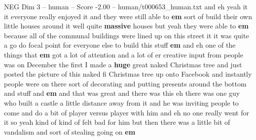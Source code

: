 \begin{textsample}{NEG Dim 3 – human – Score -2.00 – human/t000653\_human.txt}  \label{ex:f3_neg_031}
and eh yeah it it everyone really enjoyed it and they were still able to \textbf{em} sort of build their own little houses around it well quite \textbf{massive} houses but yeah they were able to \textbf{em} because all of the communal buildings were lined up on this street it it was quite a go do focal point for everyone else to build this stuff \textbf{em} and eh one of the things that \textbf{em} got a lot of attention and a lot of er creative input from people was on December the first I made a \textbf{huge} great naked Christmas tree and just posted the picture of this naked fi Christmas tree up onto Facebook and instantly people were on there sort of decorating and putting presents around the bottom and stuff and \textbf{em} and that was great and there was this eh there was one guy who built a castle a little distance away from it and he was inviting people to come and do a bit of player versus player with him and eh no one really went for it so yeah kind of kind of felt bad for him but then there was a little bit of vandalism and sort of stealing going on \textbf{em}

\end{textsample}
